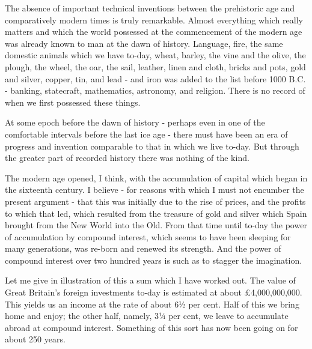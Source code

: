 The absence of important technical inventions between the prehistoric age and comparatively modern times is truly remarkable. Almost everything which really matters and which the world possessed at the commencement of the modern age was already known to man at the dawn of history. Language, fire, the same domestic animals which we have to-day, wheat, barley, the vine and the olive, the plough, the wheel, the oar, the sail, leather, linen and cloth, bricks and pots, gold and silver, copper, tin, and lead - and iron was added to the list before 1000 B.C. - banking, statecraft, mathematics, astronomy, and religion. There is no record of when we first possessed these things.\par

At some epoch before the dawn of history - perhaps even in one of the comfortable intervals before the last ice age - there must have been an era of progress and invention comparable to that in which we live to-day. But through the greater part of recorded history there was nothing of the kind.\par

The modern age opened, I think, with the accumulation of capital which began in the sixteenth century. I believe - for reasons with which I must not encumber the present argument - that this was initially due to the rise of prices, and the profits to which that led, which resulted from the treasure of gold and silver which Spain brought from the New World into the Old. From that time until to-day the power of accumulation by compound interest, which seems to have been sleeping for many generations, was re-born and renewed its strength. And the power of compound interest over two hundred years is such as to stagger the imagination.\par

Let me give in illustration of this a sum which I have worked out. The value of Great Britain’s foreign investments to-day is estimated at about £4,000,000,000. This yields us an income at the rate of about 6½ per cent. Half of this we bring home and enjoy; the other half, namely, 3¼ per cent, we leave to accumulate abroad at compound interest. Something of this sort has now been going on for about 250 years.\par

